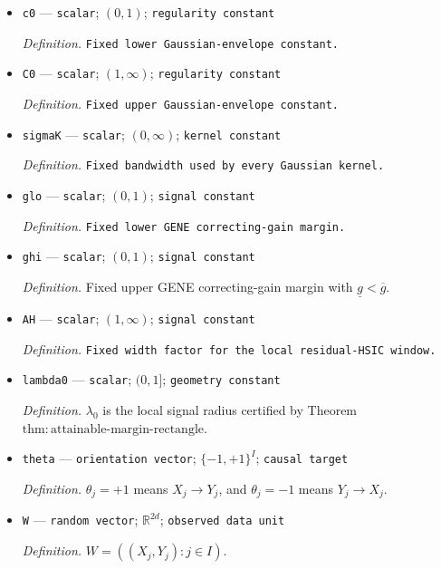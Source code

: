 \documentclass{article}
\begin{document}
\begin{itemize}
  \par\smallskip\noindent\emph{Definition.} \texttt{Fixed radius for the smoothness envelope.}
  \item \texttt{c0} --- \texttt{scalar}; \((0,1)\); \texttt{regularity constant}
  \par\smallskip\noindent\emph{Definition.} \texttt{Fixed lower Gaussian-\allowbreak{}envelope constant.}
  \item \texttt{C0} --- \texttt{scalar}; \((1,\infty)\); \texttt{regularity constant}
  \par\smallskip\noindent\emph{Definition.} \texttt{Fixed upper Gaussian-\allowbreak{}envelope constant.}
  \item \texttt{sigmaK} --- \texttt{scalar}; \((0,\infty)\); \texttt{kernel constant}
  \par\smallskip\noindent\emph{Definition.} \texttt{Fixed bandwidth used by every Gaussian kernel.}
  \item \texttt{glo} --- \texttt{scalar}; \((0,1)\); \texttt{signal constant}
  \par\smallskip\noindent\emph{Definition.} \texttt{Fixed lower GENE correcting-\allowbreak{}gain margin.}
  \item \texttt{ghi} --- \texttt{scalar}; \((0,1)\); \texttt{signal constant}
  \par\smallskip\noindent\emph{Definition.} Fixed upper GENE correcting-gain margin with \(\underline g<\overline g\).
  \item \texttt{AH} --- \texttt{scalar}; \((1,\infty)\); \texttt{signal constant}
  \par\smallskip\noindent\emph{Definition.} \texttt{Fixed width factor for the local residual-\allowbreak{}HSIC window.}
  \item \texttt{lambda0} --- \texttt{scalar}; \((0,1]\); \texttt{geometry constant}
  \par\smallskip\noindent\emph{Definition.} \(\lambda_0\) is the local signal radius certified by Theorem \(\mathrm{thm:attainable\text{-}margin\text{-}rectangle}\).
  \item \texttt{theta} --- \texttt{orientation vector}; \(\{-1,+1\}^{I}\); \texttt{causal target}
  \par\smallskip\noindent\emph{Definition.} \(\theta_j=+1\) means \(X_j\to Y_j\), and \(\theta_j=-1\) means \(Y_j\to X_j\).
  \item \texttt{W} --- \texttt{random vector}; \(\mathbb R^{2d}\); \texttt{observed data unit}
  \par\smallskip\noindent\emph{Definition.} \(W=((X_j,Y_j):j\in I)\).

\end{itemize}
\end{document}
